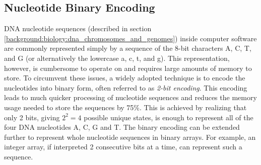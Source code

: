 \subsection{Nucleotide Binary Encoding} \label{background:nucleotide_binary_encoding}
DNA nucleotide sequences (described in section \ref{background:biology:dna_chromosomes_and_genomes}) inside computer software are commonly represented simply by a sequence of the 8-bit characters A, C, T, and G (or alternatively the lowercase a, c, t, and g).
This representation, however, is cumbersome to operate on and requires large amounts of memory to store.
To circumvent these issues, a widely adopted technique is to encode the nucleotides into binary form, often referred to as \textit{2-bit encoding}.
This encoding leads to much quicker processing of nucleotide sequences and reduces the memory usage needed to store the sequences by 75\%.
This is achieved by realizing that only 2 bits, giving \textit{$2^2=4$} possible unique states, is enough to represent all of the four DNA nucleotides A, C, G and T.
The binary encoding can be extended further to represent whole nucleotide sequences in binary arrays.
For example, an integer array, if interpreted 2 consecutive bits at a time, can represent such a sequence.


